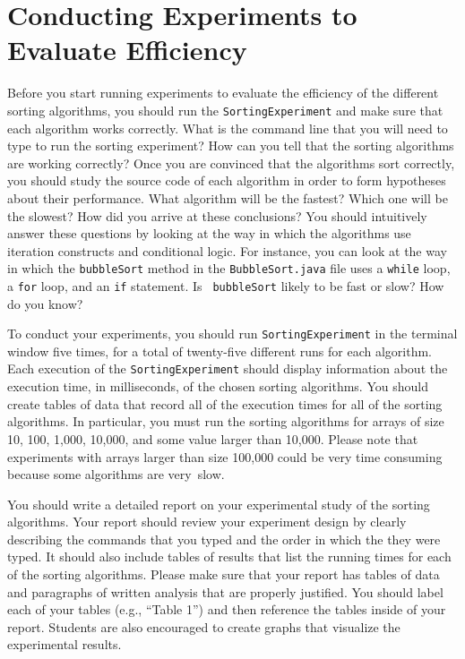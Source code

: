 \section*{Conducting Experiments to Evaluate Efficiency}

Before you start running experiments to evaluate the efficiency of the different sorting algorithms, you should run the
{\tt SortingExperiment} and make sure that each algorithm works correctly.  What is the command line that you will need
to type to run the sorting experiment? How can you tell that the sorting algorithms are working correctly? Once you are
convinced that the algorithms sort correctly, you should study the source code of each algorithm in order to form 
hypotheses about their performance.  What algorithm will be the fastest? Which one will be the slowest? How did you
arrive at these conclusions? You should intuitively answer these questions by looking at the way in which the algorithms
use iteration constructs and conditional logic. For instance, you can look at the way in which the {\tt bubbleSort}
method in the {\tt BubbleSort.java} file uses a {\tt while} loop, a {\tt for} loop, and an {\tt if} statement. Is {\tt
  bubbleSort} likely to be fast or slow? How do you know?  

To conduct your experiments, you should run {\tt SortingExperiment} in the terminal window five times, for a total of
twenty-five different runs for each algorithm. Each execution of the {\tt SortingExperiment} should display information
about the execution time, in milliseconds, of the chosen sorting algorithms. You should create tables of data that
record all of the execution times for all of the sorting algorithms. In particular, you must run the sorting algorithms
for arrays of size 10, 100, 1,000, 10,000, and some value larger than 10,000. Please note that experiments 
with arrays larger than size 100,000 could be very time consuming because some algorithms are \mbox{very slow}.

You should write a detailed report on your experimental study of the sorting algorithms.  Your report should review your
experiment design by clearly describing the commands that you typed and the order in which the they were typed.  It
should also include tables of results that list the running times for each of the sorting algorithms.  Please make sure
that your report has tables of data and paragraphs of written analysis that are properly justified.  You should label
each of your tables (e.g., ``Table 1'') and then reference the tables inside of your report.  Students are also
encouraged to create graphs that visualize the experimental results.  

